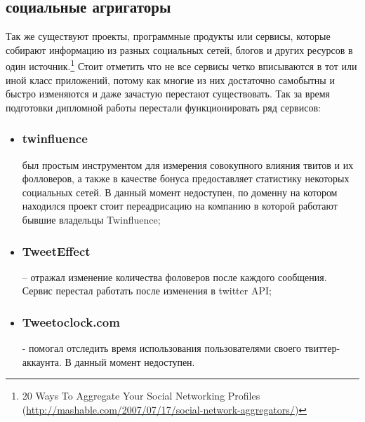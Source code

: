 \subsection{социальные агригаторы}
Так же существуют проекты, программные продукты или сервисы, которые собирают информацию из разных социальных сетей, блогов и других ресурсов в один источник.\footnote{20 Ways To Aggregate Your Social Networking Profiles (\url{http://mashable.com/2007/07/17/social-network-aggregators/})} 
Стоит отметить что не все сервисы четко вписываются в тот или иной класс приложений, потому как многие из них достаточно самобытны и быстро изменяются и даже зачастую перестают существовать. Так за время подготовки дипломной работы перестали функционировать ряд сервисов:
\begin{itemize}
\item \subsubsection{twinfluence} был простым инструментом для измерения совокупного влияния твитов и их фолловеров, а также в качестве бонуса предоставляет статистику некоторых социальных сетей. В данный момент недоступен, по доменну на котором находился проект стоит переадрисацию на компанию в которой работают бывшие владельцы Twinfluence;
\item \subsubsection{TweetEffect} – отражал изменение количества фоловеров после каждого сообщения. Сервис перестал работать после изменения в twitter API;
\item \subsubsection {Tweetoclock.com} - помогал отследить время использования пользователями своего твиттер-аккаунта. В данный момент недоступен.
\end{itemize}

